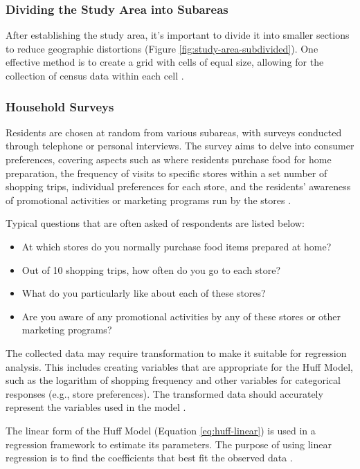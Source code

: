 \subsubsection{Dividing the Study Area into Subareas}
\label{label:dividing-the-study-area-into-subareas}

After establishing the study area, it's important to divide it into smaller sections to reduce geographic distortions (Figure \ref{fig:study-area-subdivided}). One effective method is to create a grid with cells of equal size, allowing for the collection of census data within each cell \cite{huff2008calibrating}.

\subsubsection{Household Surveys}

Residents are chosen at random from various subareas, with surveys conducted through telephone or personal interviews. The survey aims to delve into consumer preferences, covering aspects such as where residents purchase food for home preparation, the frequency of visits to specific stores within a set number of shopping trips, individual preferences for each store, and the residents' awareness of promotional activities or marketing programs run by the stores \cite{huff2008calibrating}.

Typical questions that are often asked of respondents are listed below:
\begin{itemize}
    \item At which stores do you normally purchase food items prepared at home?
    \item Out of 10 shopping trips, how often do you go to each store?
    \item What do you particularly like about each of these stores?
    \item Are you aware of any promotional activities by any of these stores or other
    marketing programs?
\end{itemize}

The collected data may require transformation to make it suitable for regression analysis. This includes creating variables that are appropriate for the Huff Model, such as the logarithm of shopping frequency and other variables for categorical responses (e.g., store preferences). The transformed data should accurately represent the variables used in the model \cite{huff2008calibrating}. 

The linear form of the Huff Model (Equation \ref{eq:huff-linear}) is used in a regression framework to estimate its parameters. The purpose of using linear regression is to find the coefficients that best fit the observed data \cite{huff2008calibrating}.


